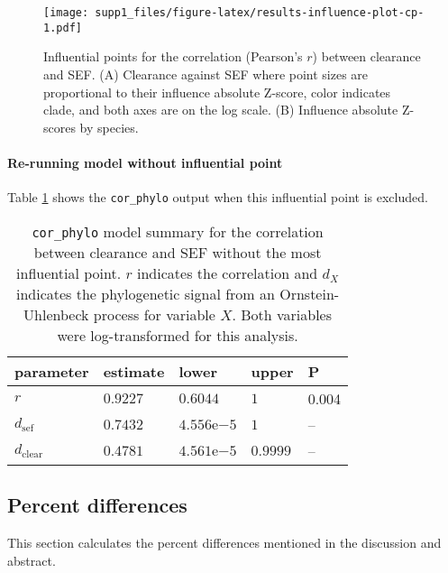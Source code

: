 \documentclass[12pt,]{article}
\let\oldparagraph\paragraph
\renewcommand{\paragraph}[1]{\oldparagraph{#1}\mbox{}}
\begin{document}
\begin{figure}
\centering
\texttt{[image: supp1\_files/figure-latex/results-influence-plot-cp-1.pdf]}
\caption{\label{fig:results-influence-plot-cp}Influential points for the correlation (Pearson's \(r\)) between clearance and SEF. (A) Clearance against SEF where point sizes are proportional to their influence absolute Z-score, color indicates clade, and both axes are on the log scale. (B) Influence absolute Z-scores by species.}
\end{figure}

\hypertarget{re-running-model-without-influential-point-1}{%
\paragraph{Re-running model without influential point}\label{re-running-model-without-influential-point-1}}

Table \ref{tab:results-re-run-summ-dfs-cor-phylo} shows the \texttt{cor\_phylo} output
when this influential point is excluded.

\begin{table}[t]

\caption{\label{tab:results-re-run-summ-dfs-cor-phylo}\texttt{cor\_phylo} model summary for the correlation between clearance and SEF without the most influential point. $r$ indicates the correlation and $d_X$ indicates the phylogenetic signal from an Ornstein-Uhlenbeck process for variable $X$. Both variables were log-transformed for this analysis.}
\centering
\begin{tabular}{lllll}
\toprule
parameter & estimate & lower & upper & P\\
\midrule
$r$ & $0.9227$ & $0.6044$ & $1$ & 0.004\\
$d_{\text{sef}}$ & $0.7432$ & $4.556 \mathrm{e}{-5}$ & $1$ & –\\
$d_{\text{clear}}$ & $0.4781$ & $4.561 \mathrm{e}{-5}$ & $0.9999$ & –\\
\bottomrule
\end{tabular}
\end{table}

\hypertarget{percent-differences}{%
\subsection{Percent differences}\label{percent-differences}}

This section calculates the percent differences mentioned in the discussion and abstract.
\end{document}
